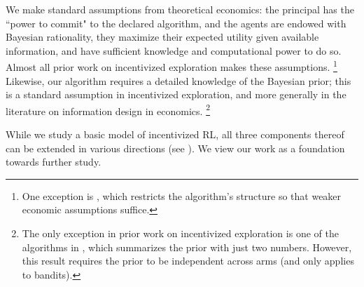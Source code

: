 
We make standard assumptions from theoretical economics: the principal has the ``power to commit" to the declared algorithm, and the agents are endowed with Bayesian rationality, \ie they maximize their expected utility given available information, and have sufficient knowledge and computational power to do so. Almost all prior work on incentivized exploration makes these assumptions.%
\footnote{One exception is \citep{Jieming-unbiased18}, which restricts the algorithm's structure so that weaker economic assumptions suffice.}
Likewise, our algorithm requires a detailed knowledge of the Bayesian prior; this is a standard assumption in incentivized exploration, and more generally in the literature on information design in economics.%
\footnote{The only exception in prior work on incentivized exploration is one of the algorithms in \citep{ICexploration-ec15}, which summarizes the prior with just two numbers. However, this result requires the prior to be independent across arms (and only applies to bandits).}

While we study a basic model of incentivized RL, all three components thereof can be extended in various directions (see ). We view our work as a foundation towards further study.






